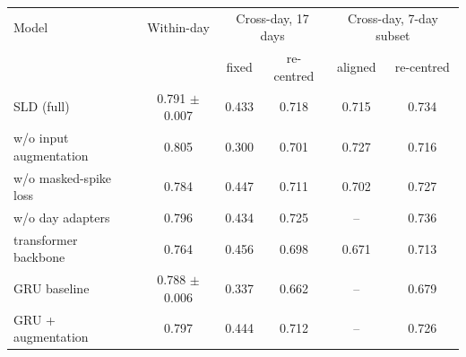 \begin{tabular}{lccccc}
\toprule
Model & Within-day & \multicolumn{2}{c}{Cross-day, 17 days} & \multicolumn{2}{c}{Cross-day, 7-day subset} \\
 & & fixed & re-centred & aligned & re-centred \\
\midrule
SLD (full) & 0.791 $\pm$ 0.007 & 0.433 & 0.718 & 0.715 & 0.734 \\
w/o input augmentation & 0.805 & 0.300 & 0.701 & 0.727 & 0.716 \\
w/o masked-spike loss & 0.784 & 0.447 & 0.711 & 0.702 & 0.727 \\
w/o day adapters & 0.796 & 0.434 & 0.725 & -- & 0.736 \\
transformer backbone & 0.764 & 0.456 & 0.698 & 0.671 & 0.713 \\
GRU baseline & 0.788 $\pm$ 0.006 & 0.337 & 0.662 & -- & 0.679 \\
GRU + augmentation & 0.797 & 0.444 & 0.712 & -- & 0.726 \\
\bottomrule
\end{tabular}
